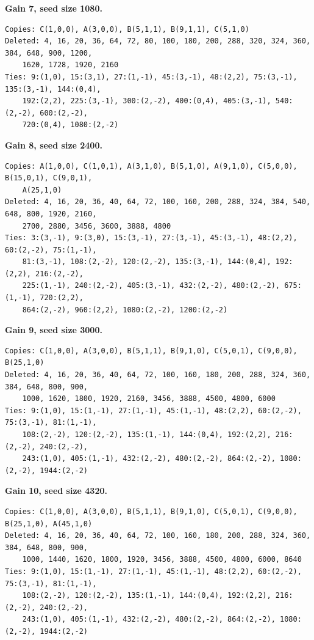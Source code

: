 \noindent\textbf{Gain 7, seed size 1080.}
\begin{scriptsize}
\begin{verbatim}
Copies: C(1,0,0), A(3,0,0), B(5,1,1), B(9,1,1), C(5,1,0)
Deleted: 4, 16, 20, 36, 64, 72, 80, 100, 180, 200, 288, 320, 324, 360, 384, 648, 900, 1200,
    1620, 1728, 1920, 2160
Ties: 9:(1,0), 15:(3,1), 27:(1,-1), 45:(3,-1), 48:(2,2), 75:(3,-1), 135:(3,-1), 144:(0,4),
    192:(2,2), 225:(3,-1), 300:(2,-2), 400:(0,4), 405:(3,-1), 540:(2,-2), 600:(2,-2),
    720:(0,4), 1080:(2,-2)
\end{verbatim}
\end{scriptsize}

\noindent\textbf{Gain 8, seed size 2400.}
\begin{scriptsize}
\begin{verbatim}
Copies: A(1,0,0), C(1,0,1), A(3,1,0), B(5,1,0), A(9,1,0), C(5,0,0), B(15,0,1), C(9,0,1),
    A(25,1,0)
Deleted: 4, 16, 20, 36, 40, 64, 72, 100, 160, 200, 288, 324, 384, 540, 648, 800, 1920, 2160,
    2700, 2880, 3456, 3600, 3888, 4800
Ties: 3:(3,-1), 9:(3,0), 15:(3,-1), 27:(3,-1), 45:(3,-1), 48:(2,2), 60:(2,-2), 75:(1,-1),
    81:(3,-1), 108:(2,-2), 120:(2,-2), 135:(3,-1), 144:(0,4), 192:(2,2), 216:(2,-2),
    225:(1,-1), 240:(2,-2), 405:(3,-1), 432:(2,-2), 480:(2,-2), 675:(1,-1), 720:(2,2),
    864:(2,-2), 960:(2,2), 1080:(2,-2), 1200:(2,-2)
\end{verbatim}
\end{scriptsize}

\noindent\textbf{Gain 9, seed size 3000.}
\begin{scriptsize}
\begin{verbatim}
Copies: C(1,0,0), A(3,0,0), B(5,1,1), B(9,1,0), C(5,0,1), C(9,0,0), B(25,1,0)
Deleted: 4, 16, 20, 36, 40, 64, 72, 100, 160, 180, 200, 288, 324, 360, 384, 648, 800, 900,
    1000, 1620, 1800, 1920, 2160, 3456, 3888, 4500, 4800, 6000
Ties: 9:(1,0), 15:(1,-1), 27:(1,-1), 45:(1,-1), 48:(2,2), 60:(2,-2), 75:(3,-1), 81:(1,-1),
    108:(2,-2), 120:(2,-2), 135:(1,-1), 144:(0,4), 192:(2,2), 216:(2,-2), 240:(2,-2),
    243:(1,0), 405:(1,-1), 432:(2,-2), 480:(2,-2), 864:(2,-2), 1080:(2,-2), 1944:(2,-2)
\end{verbatim}
\end{scriptsize}

\noindent\textbf{Gain 10, seed size 4320.}
\begin{scriptsize}
\begin{verbatim}
Copies: C(1,0,0), A(3,0,0), B(5,1,1), B(9,1,0), C(5,0,1), C(9,0,0), B(25,1,0), A(45,1,0)
Deleted: 4, 16, 20, 36, 40, 64, 72, 100, 160, 180, 200, 288, 324, 360, 384, 648, 800, 900,
    1000, 1440, 1620, 1800, 1920, 3456, 3888, 4500, 4800, 6000, 8640
Ties: 9:(1,0), 15:(1,-1), 27:(1,-1), 45:(1,-1), 48:(2,2), 60:(2,-2), 75:(3,-1), 81:(1,-1),
    108:(2,-2), 120:(2,-2), 135:(1,-1), 144:(0,4), 192:(2,2), 216:(2,-2), 240:(2,-2),
    243:(1,0), 405:(1,-1), 432:(2,-2), 480:(2,-2), 864:(2,-2), 1080:(2,-2), 1944:(2,-2)
\end{verbatim}
\end{scriptsize}

